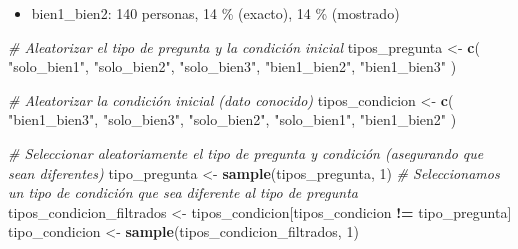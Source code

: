 \documentclass[
]{article}
\newenvironment{Shaded}{\begin{snugshade}}{\end{snugshade}}
\newcommand{\CommentTok}[1]{\textcolor[rgb]{0.56,0.35,0.01}{\textit{#1}}}
\newcommand{\DecValTok}[1]{\textcolor[rgb]{0.00,0.00,0.81}{#1}}
\newcommand{\FunctionTok}[1]{\textcolor[rgb]{0.13,0.29,0.53}{\textbf{#1}}}
\newcommand{\NormalTok}[1]{#1}
\newcommand{\OtherTok}[1]{\textcolor[rgb]{0.56,0.35,0.01}{#1}}
\newcommand{\SpecialCharTok}[1]{\textcolor[rgb]{0.81,0.36,0.00}{\textbf{#1}}}
\newcommand{\StringTok}[1]{\textcolor[rgb]{0.31,0.60,0.02}{#1}}
\providecommand{\tightlist}{%
  \setlength{\itemsep}{0pt}\setlength{\parskip}{0pt}}
\begin{document}
\begin{itemize}
\tightlist
\item
  bien1\_bien2: 140 personas, 14 \% (exacto), 14 \% (mostrado)
\end{itemize}

\begin{Shaded}
\begin{Highlighting}[]
\CommentTok{\# Aleatorizar el tipo de pregunta y la condición inicial}
\NormalTok{tipos\_pregunta }\OtherTok{\textless{}{-}} \FunctionTok{c}\NormalTok{(}
  \StringTok{"solo\_bien1"}\NormalTok{,}
  \StringTok{"solo\_bien2"}\NormalTok{,}
  \StringTok{"solo\_bien3"}\NormalTok{,}
  \StringTok{"bien1\_bien2"}\NormalTok{,}
  \StringTok{"bien1\_bien3"}
\NormalTok{)}

\CommentTok{\# Aleatorizar la condición inicial (dato conocido)}
\NormalTok{tipos\_condicion }\OtherTok{\textless{}{-}} \FunctionTok{c}\NormalTok{(}
  \StringTok{"bien1\_bien3"}\NormalTok{,}
  \StringTok{"solo\_bien3"}\NormalTok{,}
  \StringTok{"solo\_bien2"}\NormalTok{,}
  \StringTok{"solo\_bien1"}\NormalTok{,}
  \StringTok{"bien1\_bien2"}
\NormalTok{)}

\CommentTok{\# Seleccionar aleatoriamente el tipo de pregunta y condición (asegurando que sean diferentes)}
\NormalTok{tipo\_pregunta }\OtherTok{\textless{}{-}} \FunctionTok{sample}\NormalTok{(tipos\_pregunta, }\DecValTok{1}\NormalTok{)}
\CommentTok{\# Seleccionamos un tipo de condición que sea diferente al tipo de pregunta}
\NormalTok{tipos\_condicion\_filtrados }\OtherTok{\textless{}{-}}\NormalTok{ tipos\_condicion[tipos\_condicion }\SpecialCharTok{!=}\NormalTok{ tipo\_pregunta]}
\NormalTok{tipo\_condicion }\OtherTok{\textless{}{-}} \FunctionTok{sample}\NormalTok{(tipos\_condicion\_filtrados, }\DecValTok{1}\NormalTok{)}


\end{Highlighting}
\end{Shaded}
\end{document}
